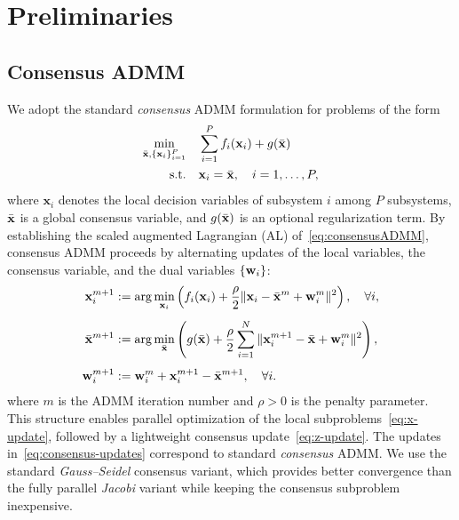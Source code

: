 \section{Preliminaries}
\label{sec:preliminaries}
\subsection{Consensus ADMM}
We adopt the standard \textit{consensus} ADMM formulation \cite{boyd2011distributed} for problems of the form
\begin{equation}\label{eq:consensusADMM}
\begin{aligned}
    \underset{\Bar{\mathbf{x}},\{\mathbf{x}_i\}_{i=1}^{P}}{\text{min}} \quad
    & \sum_{i = 1}^{P} f_i(\mathbf{x}_i) + g(\Bar{\mathbf{x}}) \\
    \text{s.t.} \quad
    & \mathbf{x}_i = \Bar{\mathbf{x}}, \quad i = 1,\dots,P ,
\end{aligned}
\end{equation}
where $\mathbf{x}_i$ denotes the local decision variables of subsystem $i$ among $P$ subsystems, $\Bar{\mathbf{x}}$ is a global consensus variable, and $g(\Bar{\mathbf{x}})$ is an optional regularization term. 
By establishing the scaled augmented Lagrangian (AL) of~\eqref{eq:consensusADMM},
consensus ADMM proceeds by alternating updates of the local variables, the consensus variable, and the dual variables $\{\mathbf{w}_i\}$:
\begin{subequations}\label{eq:consensus-updates}
\begin{align}
    \mathbf{x}_i^{m+1}
    &:= \arg\min_{\mathbf{x}_i}
    \left(
        f_i(\mathbf{x}_i)
        + \frac{\rho}{2}
        \|\mathbf{x}_i - \Bar{\mathbf{x}}^m + \mathbf{w}_i^m\|^2
    \right),
    \quad \forall i, \label{eq:x-update} \\[4pt]
    \Bar{\mathbf{x}}^{m+1}
    &:= \arg\min_{\Bar{\mathbf{x}}}
    \left(
        g(\Bar{\mathbf{x}})
        + \frac{\rho}{2}
        \sum_{i=1}^{N}
        \|\mathbf{x}_i^{m+1} - \Bar{\mathbf{x}} + \mathbf{w}_i^m\|^2
    \right), \label{eq:z-update} \\[4pt]
    \mathbf{w}_i^{m+1}
    &:= \mathbf{w}_i^m + \mathbf{x}_i^{m+1} - \Bar{\mathbf{x}}^{m+1},
    \quad \forall i. \label{eq:dual-update}
\end{align}
\end{subequations}
where $m$ is the ADMM iteration number and $\rho > 0$ is the penalty parameter.
This structure enables parallel optimization of the local subproblems~\eqref{eq:x-update}, followed by a lightweight consensus update~\eqref{eq:z-update}. The updates in~\eqref{eq:consensus-updates} correspond to standard \textit{consensus} ADMM. 
We use the standard \textit{Gauss–Seidel} consensus variant, which provides better convergence than the fully parallel \textit{Jacobi} variant while keeping the consensus subproblem inexpensive.

